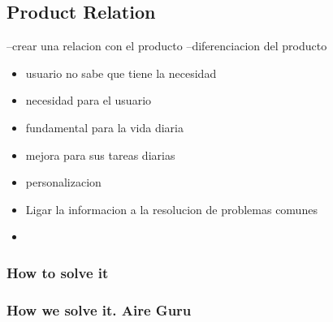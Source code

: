 \subsection{Product Relation}
 
--crear una relacion con el producto
--diferenciacion del producto 

\begin{itemize}

    \item usuario no sabe que tiene la necesidad
    \item necesidad para el usuario
    \item fundamental para la vida diaria
    \item mejora para sus tareas diarias
    \item personalizacion
    \item Ligar la informacion a la resolucion de problemas comunes
    \item \end{itemize}
\subsubsection{How to solve it} 


\subsubsection{How we solve it. Aire Guru} 
 
\begin{itemize}
    \done
    \crossed
    
\end{itemize}
\newpage
